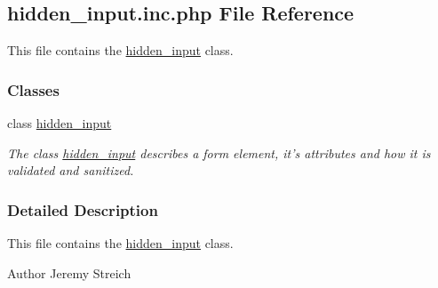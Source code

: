 \hypertarget{hidden__input_8inc_8php}{\subsection{hidden\-\_\-input.\-inc.\-php File Reference}
\label{hidden__input_8inc_8php}
}


This file contains the \hyperlink{classhidden__input}{hidden\-\_\-input} class.  


\subsubsection*{Classes}
\begin{DoxyCompactItemize}
\item 
class \hyperlink{classhidden__input}{hidden\-\_\-input}
\begin{DoxyCompactList}\small\item\em The class \hyperlink{classhidden__input}{hidden\-\_\-input} describes a form element, it's attributes and how it is validated and sanitized. \end{DoxyCompactList}\end{DoxyCompactItemize}


\subsubsection{Detailed Description}
This file contains the \hyperlink{classhidden__input}{hidden\-\_\-input} class. \begin{DoxyAuthor}{Author}
Jeremy Streich 
\end{DoxyAuthor}
